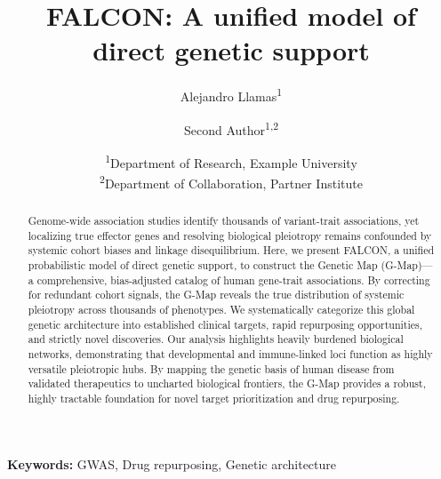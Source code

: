\documentclass[11pt, a4paper]{article}
\begin{document}
\title{FALCON: A unified model of direct genetic support}
\author{Alejandro Llamas\textsuperscript{1} \and Second Author\textsuperscript{1,2}}
\date{\textsuperscript{1}Department of Research, Example University  \\  \textsuperscript{2}Department of Collaboration, Partner Institute}

\begin{abstract}
Genome-wide association studies identify thousands of variant-trait associations, yet localizing true effector genes and resolving biological pleiotropy remains confounded by systemic cohort biases and linkage disequilibrium. Here, we present FALCON, a unified probabilistic model of direct genetic support, to construct the Genetic Map (G-Map)—a comprehensive, bias-adjusted catalog of human gene-trait associations. By correcting for redundant cohort signals, the G-Map reveals the true distribution of systemic pleiotropy across thousands of phenotypes. We systematically categorize this global genetic architecture into established clinical targets, rapid repurposing opportunities, and strictly novel discoveries. Our analysis highlights heavily burdened biological networks, demonstrating that developmental and immune-linked loci function as highly versatile pleiotropic hubs. By mapping the genetic basis of human disease from validated therapeutics to uncharted biological frontiers, the G-Map provides a robust, highly tractable foundation for novel target prioritization and drug repurposing.
\end{abstract}
\textbf{Keywords:} GWAS, Drug repurposing, Genetic architecture




\end{document}
